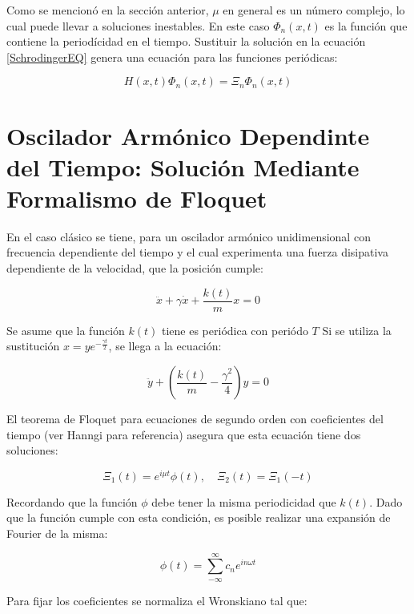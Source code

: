\documentclass[a4paper,10pt]{report}
\begin{document}
Como se mencionó en la sección anterior, $\mu$ en general es un número complejo, lo cual puede llevar a soluciones inestables. En este caso $\Phi_n(x,t)$ es la función que contiene la periodícidad en el tiempo. Sustituir la solución en la ecuación \ref{SchrodingerEQ} genera una ecuación para las funciones periódicas:

\begin{equation}
H(x,t)\Phi_n(x,t)=\Xi_n\Phi_n(x,t)
\end{equation}

\section{Oscilador Armónico Dependinte del Tiempo: Solución Mediante Formalismo de Floquet}

En el caso clásico \cite{HanngiFM} se tiene, para un oscilador armónico unidimensional con frecuencia dependiente del tiempo y el cual experimenta una fuerza disipativa dependiente de la velocidad, que la posición cumple:

\begin{equation}
\ddot{x}+\gamma\dot{x}+\frac{k(t)}{m}x=0
\end{equation}

Se asume que la función $k(t)$ tiene es periódica con periódo $T$ Si se utiliza la sustitución $x=ye^{-\frac{\gamma t}{2}}$, se llega a la ecuación:

\begin{equation}
\ddot{y} +(\frac{k(t)}{m}-\frac{\gamma^2}{4})y=0
\end{equation}

El teorema de Floquet para ecuaciones de segundo orden con coeficientes del tiempo (ver Hanngi para referencia) asegura que esta ecuación tiene dos soluciones:


\begin{equation}
\Xi_1(t) = e^{i\mu t}\phi(t), \quad \Xi_2(t)=\Xi_1(-t)
\end{equation}

Recordando que la función $\phi$ debe tener la misma periodicidad que $k(t)$. Dado que la función cumple con esta condición, es posible realizar una expansión de Fourier \cite{ArfkenMM} de la misma:

\begin{equation}
\phi(t) = \sum_{-\infty}^\infty c_n e^{in\omega t}
\end{equation}

Para fijar los coeficientes se normaliza el Wronskiano tal que:
\end{document}
